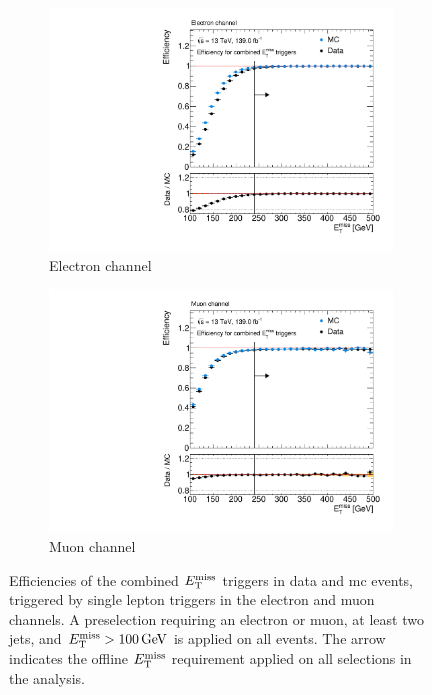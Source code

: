 \begin{figure}
	\centering
	\begin{subfigure}[b]{0.47\linewidth}
		\centering\includegraphics[width=\textwidth]{trigger/met_ele}
		\caption{Electron channel\label{fig:trigger_met_ele}}
	\end{subfigure}\hfill
	\begin{subfigure}[b]{0.47\linewidth}
		\centering\includegraphics[width=\textwidth]{trigger/met_mu}
		\caption{Muon channel\label{fig:trigger_met_mu}}
	\end{subfigure}
		\caption{Efficiencies of the combined $E_{\textrm{T}}^{\textrm{miss}}$ triggers in data and \gls{mc} events, triggered by single lepton triggers in the   electron and  muon channels. A preselection requiring an electron or muon, at least two jets, and $\etmiss > \SI{100}{\GeV}$ is applied on all events. The arrow indicates the offline $E_{\textrm{T}}^{\textrm{miss}}$ requirement applied on all selections in the analysis.}\label{fig:trigger_eff}
\end{figure}


